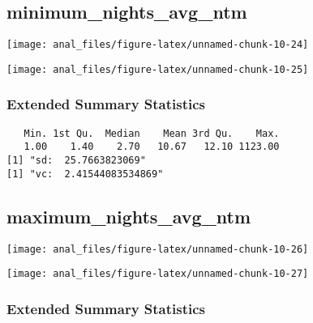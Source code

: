 \pagebreak

\hypertarget{minimum_nights_avg_ntm}{%
\subsection{minimum\_nights\_avg\_ntm}\label{minimum_nights_avg_ntm}}

\begin{center}\texttt{[image: anal\_files/figure-latex/unnamed-chunk-10-24]} \end{center}

\begin{center}\texttt{[image: anal\_files/figure-latex/unnamed-chunk-10-25]} \end{center}

\hypertarget{extended-summary-statistics-5}{%
\subsubsection{Extended Summary
Statistics}\label{extended-summary-statistics-5}}

\begin{verbatim}   Min. 1st Qu.  Median    Mean 3rd Qu.    Max. 
   1.00    1.40    2.70   10.67   12.10 1123.00 
[1] "sd:  25.7663823069"
[1] "vc:  2.41544083534869"
\end{verbatim}

\pagebreak

\hypertarget{maximum_nights_avg_ntm}{%
\subsection{maximum\_nights\_avg\_ntm}\label{maximum_nights_avg_ntm}}

\begin{center}\texttt{[image: anal\_files/figure-latex/unnamed-chunk-10-26]} \end{center}

\begin{center}\texttt{[image: anal\_files/figure-latex/unnamed-chunk-10-27]} \end{center}

\hypertarget{extended-summary-statistics-6}{%
\subsubsection{Extended Summary
Statistics}\label{extended-summary-statistics-6}}

